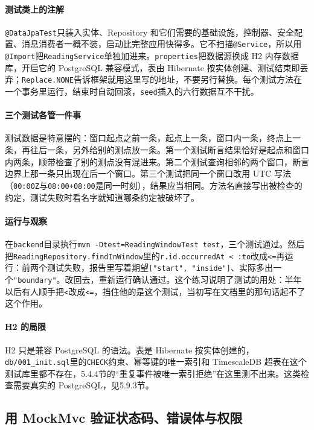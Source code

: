 \paragraph{测试类上的注解}\texttt{@DataJpaTest}只装入实体、Repository 和它们需要的基础设施，控制器、安全配置、消息消费者一概不装，启动比完整应用快得多。它不扫描\texttt{@Service}，所以用\texttt{@Import}把\texttt{ReadingService}单独加进来。\texttt{properties}把数据源换成 H2 内存数据库，开启它的 PostgreSQL 兼容模式，表由 Hibernate 按实体创建、测试结束即丢弃；\texttt{Replace.NONE}告诉框架就用这里写的地址，不要另行替换。每个测试方法在一个事务里运行，结束时自动回滚，\texttt{seed}插入的六行数据互不干扰。

\paragraph{三个测试各管一件事}测试数据是特意摆的：窗口起点之前一条，起点上一条，窗口内一条，终点上一条，再往后一条，另外给别的测点放一条。第一个测试断言结果恰好是起点和窗口内两条，顺带检查了别的测点没有混进来。第二个测试查询相邻的两个窗口，断言边界上那一条只出现在后一个窗口。第三个测试把同一个窗口改用 UTC 写法（\texttt{00:00Z}与\texttt{08:00+08:00}是同一时刻），结果应当相同。方法名直接写出被检查的约定，测试失败时看名字就知道哪条约定被破坏了。

\paragraph{运行与观察}在\texttt{backend}目录执行\texttt{mvn -Dtest=ReadingWindowTest test}，三个测试通过。然后把\texttt{ReadingRepository.findInWindow}里的\texttt{r.id.occurredAt < :to}改成\texttt{<=}再运行：前两个测试失败，报告里写着期望\texttt{["start", "inside"]}、实际多出一个\texttt{"boundary"}。改回去，重新运行确认通过。这个练习说明了测试的用处：半年以后有人顺手把\texttt{<}改成\texttt{<=}，挡住他的是这个测试，当初写在文档里的那句话起不了这个作用。

\paragraph{H2 的局限}H2 只是兼容 PostgreSQL 的语法。表是 Hibernate 按实体创建的，\texttt{db/001\_init.sql}里的\texttt{CHECK}约束、幂等键的唯一索引和 TimescaleDB 超表在这个测试库里都不存在，5.4.4节的“重复事件被唯一索引拒绝”在这里测不出来。这类检查需要真实的 PostgreSQL，见5.9.3节。

\subsection{用 MockMvc 验证状态码、错误体与权限}

